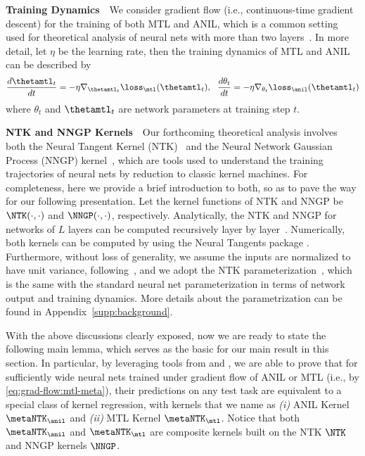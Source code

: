 \documentclass{article}
\begin{document}
\textbf{Training Dynamics}~~We consider gradient flow (i.e., continuous-time gradient descent) for the training of both MTL and ANIL, which is a common setting used for theoretical analysis of neural nets with more than two layers~\citep{ntk,lee2019wide,CNTK}. In more detail, let $\eta$ be the learning rate, then the training dynamics of MTL and ANIL can be described by
\begin{align}\label{eq:grad-flow:mtl-meta}
    \frac{d \thetamtl_t}{dt} = -\eta \nabla_{\thetamtl_t} \loss_\mtl(\thetamtl_t), ~~\frac{d \theta_t}{dt} = -\eta \nabla_{\theta_t} \loss_\anil(\thetamtl_t)
\end{align}
where $\theta_t$ and $\thetamtl_t$ are network parameters at training step $t$.

\textbf{NTK and NNGP Kernels}~~Our forthcoming theoretical analysis involves both the Neural Tangent Kernel (NTK)~\cite{ntk,du2019icml,AllenZhu2018ACT} and the Neural Network Gaussian Process (NNGP) kernel~\citep{lee2018deep,novak2019bayesian}, which are tools used to understand the training trajectories of neural nets by reduction to classic kernel machines. For completeness, here we provide a brief introduction to both, so as to pave the way for our following presentation. Let the kernel functions of NTK and NNGP be $\NTK(\cdot,\cdot)$ and $\NNGP(\cdot,\cdot)$, respectively. Analytically, the NTK and NNGP for networks of $L$ layers can be computed recursively layer by layer~\citep{lee2019wide,CNTK}. Numerically, both kernels can be computed by using the Neural Tangents package \cite{neuraltangents2020}. Furthermore, without loss of generality, we assume the inputs are normalized to have unit variance, following~\citep{xiao2020dis}, and we adopt the NTK parameterization~\citep{lee2019wide}, which is the same with the standard neural net parameterization in terms of network output and training dynamics. More details about the parametrization can be found in Appendix~\ref{supp:background}.

With the above discussions clearly exposed, now we are ready to state the following main lemma, which serves as the basic for our main result in this section. In particular, by leveraging tools from \citet{lee2019wide} and \citet{meta-ntk}, we are able to prove that for sufficiently wide neural nets trained under gradient flow of ANIL or MTL (i.e., by \eqref{eq:grad-flow:mtl-meta}), their predictions on any test task are equivalent to a special class of kernel regression, with kernels that we name as \textit{(i)} ANIL Kernel $\metaNTK_\anil$ and \textit{(ii)} MTL Kernel $\metaNTK_\mtl$. Notice that both $\metaNTK_\anil$ and $\metaNTK_\mtl$ are composite kernels built on the NTK $\NTK$ and NNGP kernels $\NNGP$. 
\end{document}
